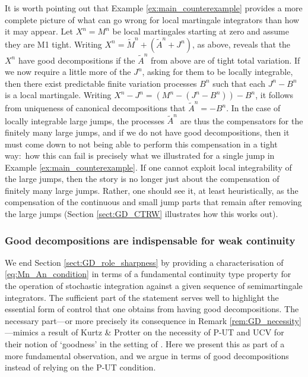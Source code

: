 \documentclass[11pt]{article}
\theoremstyle{definition}\newtheorem{example}[theorem]{Example}
\theoremstyle{definition}\newtheorem{counterexample}[theorem]{Counterexample}
\theoremstyle{definition}\newtheorem{remark}[theorem]{Remark}
\theoremstyle{definition}\newtheorem{defi}[theorem]{Definition}
\numberwithin{equation}{section}
\renewcommand{\|}{\; : \, \;}											%
\begin{document}
It is worth pointing out that Example \ref{ex:main_counterexample} provides a more complete picture of what can go wrong for local martingale integrators than how it may appear. Let $X^n=M^n$ be local martingales starting at zero and assume they are M1 tight. Writing $X^n=\tilde{M}^n+(\tilde{A}^n+J^n)$, as above, reveals that the $X^n$ have good decompositions if the $\tilde{A}^n$ from above are of tight total variation. If we now require a little more of the $J^n$, asking for them to be locally integrable, then there exist predictable finite variation processes $B^n$ such that each $J^n - B^n$ is a local martingale. Writing $X^n-J^n=(M^n-(J^n-B^n))-B^n$, it follows from uniqueness of canonical decompositions that $\tilde{A}^n=-B^n$. In the case of locally integrable large jumps, the processes $\tilde{A}^n$ are thus the compensators for the finitely many large jumps, and if we do not have good decompositions, then it must come down to not being able to perform this compensation in a tight way:~how this can fail is precisely what we illustrated for a single jump in Example \ref{ex:main_counterexample}. If one cannot exploit local integrability of the large jumps, then the story is no longer just about the compensation of finitely many large jumps. Rather, one should see it, at least heuristically, as the compensation of the continuous and small jump parts that remain after removing the large jumps (Section \ref{sect:GD_CTRW} illustrates how this works out).

\subsubsection{Good decompositions are indispensable for weak continuity}\label{sect:GD_indispensable}

We end Section \ref{sect:GD_role_sharpness} by providing a characterisation of \eqref{eq:Mn_An_condition} in terms of a fundamental continuity type property for the operation of stochastic integration against a given sequence of semimartingale integrators. The sufficient part of the statement serves well to highlight the essential form of control that one obtains from having good decompositions. The necessary part---or more precisely its consequence in Remark \ref{rem:GD_necessity}---mimics a result of Kurtz \& Protter \cite[Thm.~4]{KP_Durham} on the necessity of P-UT and UCV for their notion of `goodness' in the setting of \cite{jakubowskimeminpages,kurtzprotter}. Here we present this as part of a more fundamental observation, and we argue in terms of good decompositions instead of relying on the P-UT condition.
\end{document}
